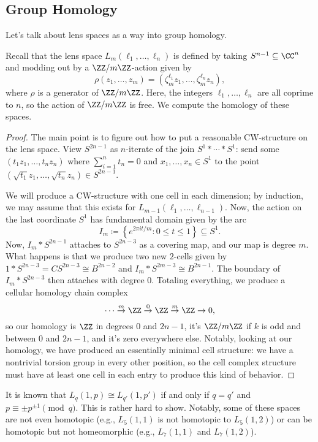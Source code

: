 \documentclass[../notes.tex]{subfiles}
\begin{document}
\subsection{Group Homology}
Let's talk about lens spaces as a way into group homology.
\begin{example}
	Recall that the lens space $L_m(\ell_1,\ldots,\ell_n)$ is defined by taking $S^{n-1}\subseteq\CC^n$ and modding out by a $\ZZ/m\ZZ$-action given by
	\[\rho(z_1,\ldots,z_m)=\left(\zeta_m^{\ell_1}z_1,\ldots,\zeta_m^{\ell_n}z_n\right),\]
	where $\rho$ is a generator of $\ZZ/m\ZZ$. Here, the integers $\ell_1,\ldots,\ell_n$ are all coprime to $n$, so the action of $\ZZ/m\ZZ$ is free. We compute the homology of these spaces.
\end{example}
\begin{proof}
	The main point is to figure out how to put a reasonable CW-structure on the lens space. View $S^{2n-1}$ as $n$-iterate of the join $S^1*\cdots*S^1$: send some $(t_1z_1,\ldots,t_nz_n)$ where $\sum_{i=1}^nt_n=0$ and $x_1,\ldots,x_n\in S^1$ to the point $(\sqrt{t_1}z_1,\ldots,\sqrt{t_n}z_n)\in S^{2n-1}$.
	
	We will produce a CW-structure with one cell in each dimension; by induction, we may assume that this exists for $L_{m-1}(\ell_1,\ldots,\ell_{n-1})$. Now, the action on the last coordinate $S^1$ has fundamental domain given by the arc
	\[I_m\coloneqq\left\{e^{2\pi it/m}:0\le t\le1\right\}\subseteq S^1.\]
	Now, $I_m*S^{2n-1}$ attaches to $S^{2n-3}$ as a covering map, and our map is degree $m$. What happens is that we produce two new $2$-cells given by $1*S^{2n-3}=CS^{2n-3}\cong B^{2n-2}$ and $I_m*S^{2m-3}\cong B^{2n-1}$. The boundary of $I_m*S^{2n-3}$ then attaches with degree $0$. Totaling everything, we produce a cellular homology chain complex
	\[\cdots\stackrel m\to\ZZ\stackrel0\to\ZZ\stackrel m\to\ZZ\to0,\]
	so our homology is $\ZZ$ in degrees $0$ and $2n-1$, it's $\ZZ/m\ZZ$ if $k$ is odd and between $0$ and $2n-1$, and it's zero everywhere else. Notably, looking at our homology, we have produced an essentially minimal cell structure: we have a nontrivial torsion group in every other position, so the cell complex structure must have at least one cell in each entry to produce this kind of behavior.
\end{proof}
\begin{remark}
	It is known that $L_q(1,p)\cong L_{q'}(1,p')$ if and only if $q=q'$ and $p\equiv \pm p^{\pm1}\pmod q$. This is rather hard to show. Notably, some of these spaces are not even homotopic (e.g., $L_5(1,1)$ is not homotopic to $L_5(1,2)$) or can be homotopic but not homeomorphic (e.g., $L_7(1,1)$ and $L_7(1,2)$).
\end{remark}
\end{document}
